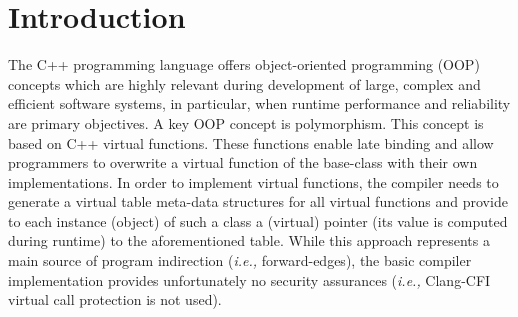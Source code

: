 \section{Introduction}
\label{chapter:Introduction}

The C++ programming language offers object-oriented programming (OOP) concepts which are highly relevant 
during development of large, complex and efficient software systems, in particular, 
when runtime performance and reliability are primary objectives.
A key OOP concept is polymorphism. This concept is based on C++ virtual functions. These functions enable late binding and allow programmers 
to overwrite a virtual function of the base-class with their own implementations. In order to implement virtual functions, 
the compiler needs to generate a virtual table meta-data structures for all virtual functions and provide to each 
instance (object) of such a class a (virtual) pointer (its value is computed during runtime) to the aforementioned table.
While this approach represents a main source of program indirection (\textit{i.e.,} forward-edges), 
the basic compiler implementation provides unfortunately no security assurances 
(\textit{i.e.,} Clang-CFI~\cite{clang:cfi} virtual call protection is not used). 


